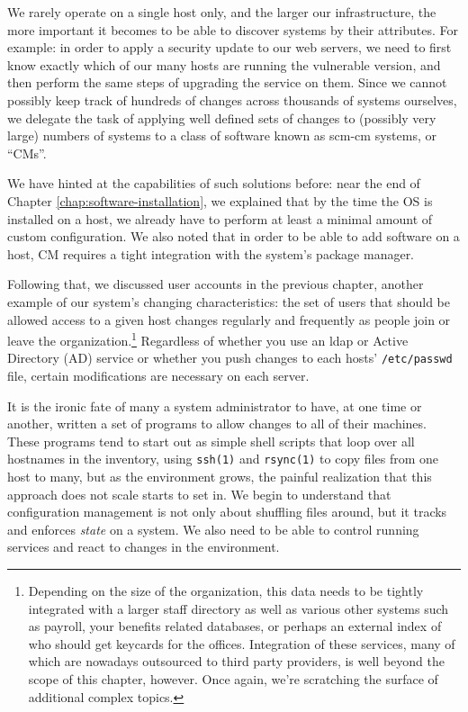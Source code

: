 We rarely operate on a single host only, and the
larger our infrastructure, the more important it
becomes to be able to discover systems by their
attributes.  For example: in order to apply a security
update to our web servers, we need to first know
exactly which of our many hosts are running the
vulnerable version, and then perform the same steps of
upgrading the service on them.  Since we cannot
possibly keep track of hundreds of changes across
thousands of systems ourselves, we delegate the task
of applying well defined sets of changes to (possibly
very large) numbers of systems to a class of software
known as \gls{scm-cm}
systems, or ``CMs''.

We have hinted at the capabilities of such solutions
before: near the end of Chapter
\ref{chap:software-installation}, we explained that by
the time the OS is installed on a host, we already
have to perform at least a minimal amount of custom
configuration.  We also noted that in order to be able
to add software on a host, CM requires a tight
integration with the system's package manager.

Following that, we discussed user accounts in the
previous chapter, another example of our system's
changing characteristics: the set of users that should
be allowed access to a given host changes regularly
and frequently as people join or leave the
organization.\footnote{Depending on the size of the
organization, this data needs to be tightly integrated
with a larger staff directory as well as various other
systems such as payroll, your benefits related
databases, or perhaps an external index of who should
get keycards for the offices.  Integration of these
services, many of which are nowadays outsourced to
third party providers, is well beyond the scope of
this chapter, however.  Once again, we're scratching
the surface of additional complex topics.} Regardless
of whether you use an \gls{ldap} or Active
Directory (AD) service or whether you push changes to
each hosts' {\tt /etc/passwd} file, certain
modifications are necessary on each server.  

It is the ironic fate of many a system administrator
to have, at one time or another, written a set of
programs to allow changes to all of their machines.
These programs tend to start out as simple shell
scripts that loop over all hostnames in the inventory,
using {\tt ssh(1)} and {\tt rsync(1)} to copy files
from one host to many, but as the environment grows,
the painful realization that this approach does not
scale starts to set in.  We begin to understand that
configuration management is not only about shuffling
files around, but it tracks and enforces {\em state}
on a system.  We also need to be able to control
running services and react to changes in the
environment.

